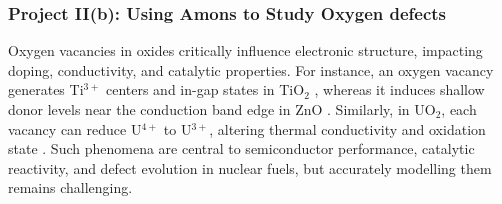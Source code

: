 \documentclass[11pt,english,calcwidth,compact]{nserc-appendix}
\begin{document}

\subsubsection*{Project II(b): Using Amons to Study Oxygen defects}  
 
 Oxygen vacancies in oxides critically influence electronic structure, impacting doping, conductivity, and catalytic properties. For instance, an oxygen vacancy generates Ti$^{3+}$ centers and in-gap states in TiO$_2$ \cite{bharti2016formation}, whereas it induces shallow donor levels near the conduction band edge in ZnO \cite{KIM20121711}. Similarly, in UO$_2$, each vacancy can reduce U$^{4+}$ to U$^{3+}$, altering thermal conductivity and oxidation state \cite{dorado2012first}. Such phenomena are central to semiconductor performance, catalytic reactivity, and defect evolution in nuclear fuels, but accurately modelling them remains challenging.
\end{document}
